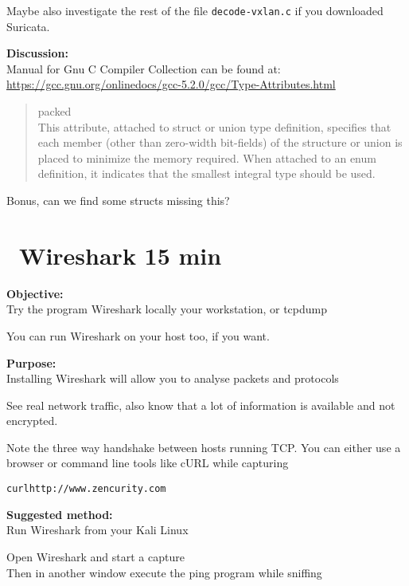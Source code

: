\documentclass[a4paper,11pt,notitlepage]{report}
\begin{document}
Maybe also investigate the rest of the file \verb+decode-vxlan.c+ if you downloaded Suricata.

{\bf Discussion:}\\
Manual for Gnu C Compiler Collection can be found at:\\
\url{https://gcc.gnu.org/onlinedocs/gcc-5.2.0/gcc/Type-Attributes.html}


\begin{quote}
packed\\
This attribute, attached to struct or union type definition, specifies that each member (other than zero-width bit-fields) of the structure or union is placed to minimize the memory required. When attached to an enum definition, it indicates that the smallest integral type should be used.
\end{quote}

Bonus, can we find some structs missing this?



\chapter{\faInfoCircle\ Wireshark 15 min}
\label{ex:wireshark-install}



{\bf Objective:}\\
Try the program Wireshark locally your workstation, or tcpdump

You can run Wireshark on your host too, if you want.

{\bf Purpose:}\\
Installing Wireshark will allow you to analyse packets and protocols

See real network traffic, also know that a lot of information is available and not encrypted.

Note the three way handshake between hosts running TCP. You can either use a browser or command line tools like cURL while capturing

\begin{alltt}
curl http://www.zencurity.com
\end{alltt}


{\bf Suggested method:}\\
Run Wireshark from your Kali Linux

Open Wireshark and start a capture\\
Then in another window execute the ping program while sniffing
\end{document}
